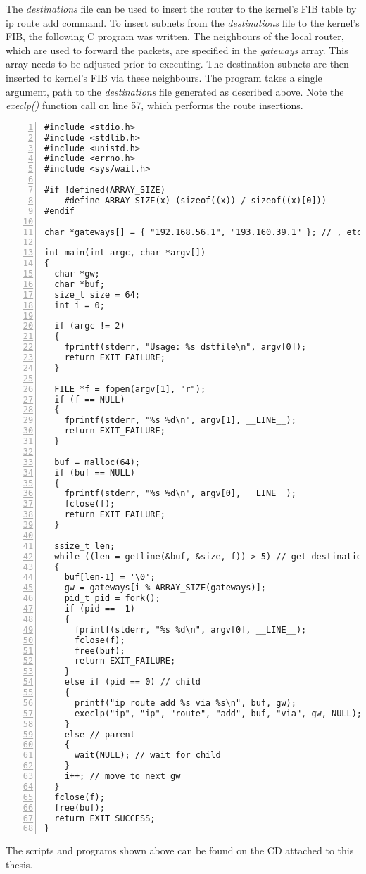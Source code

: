 The {\it{destinations}} file can be used to insert the router to the kernel's FIB table by ip route add command.
To insert subnets from the {\it{destinations}} file to the kernel's FIB, the following C program was written.
The neighbours of the local router, which are used to forward the packets, are specified in the {\it{gateways}} array.
This array needs to be adjusted prior to executing.
The destination subnets are then inserted to kernel's FIB via these neighbours.
The program takes a single argument, path to the {\it{destinations}} file generated as described above.
Note the {\it{execlp()}} function call on line 57, which performs the route insertions.
\begin{lstlisting}[numbers=left]
#include <stdio.h>
#include <stdlib.h>
#include <unistd.h>
#include <errno.h>
#include <sys/wait.h>

#if !defined(ARRAY_SIZE)
    #define ARRAY_SIZE(x) (sizeof((x)) / sizeof((x)[0]))
#endif

char *gateways[] = { "192.168.56.1", "193.160.39.1" }; // , etc. };

int main(int argc, char *argv[])
{
  char *gw;
  char *buf;
  size_t size = 64;
  int i = 0;

  if (argc != 2)
  {
    fprintf(stderr, "Usage: %s dstfile\n", argv[0]);
    return EXIT_FAILURE;
  }

  FILE *f = fopen(argv[1], "r");
  if (f == NULL)
  {
    fprintf(stderr, "%s %d\n", argv[1], __LINE__);
    return EXIT_FAILURE;
  }

  buf = malloc(64);
  if (buf == NULL)
  {
    fprintf(stderr, "%s %d\n", argv[0], __LINE__);
    fclose(f);
    return EXIT_FAILURE;
  }

  ssize_t len;
  while ((len = getline(&buf, &size, f)) > 5) // get destination subnets
  {
    buf[len-1] = '\0';
    gw = gateways[i % ARRAY_SIZE(gateways)];
    pid_t pid = fork();
    if (pid == -1)
    {
      fprintf(stderr, "%s %d\n", argv[0], __LINE__);
      fclose(f);
      free(buf);
      return EXIT_FAILURE;
    }
    else if (pid == 0) // child
    {
      printf("ip route add %s via %s\n", buf, gw);
      execlp("ip", "ip", "route", "add", buf, "via", gw, NULL);
    }
    else // parent
    {
      wait(NULL); // wait for child
    }
    i++; // move to next gw
  }
  fclose(f);
  free(buf);
  return EXIT_SUCCESS;
}
\end{lstlisting}

The scripts and programs shown above can be found on the CD attached to this thesis.


